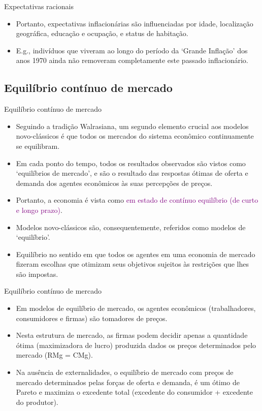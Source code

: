 \documentclass[10pt]{beamer}
\begin{document}
\begin{frame}{Expectativas racionais}
    \begin{itemize}
        \item Portanto, expectativas inflacionárias são influenciadas por idade, localização geográfica, educação e ocupação, e status de habitação.
        \bigskip
        \item E.g., indivíduos que viveram ao longo do período da `Grande Inflação' dos anos 1970 ainda não removeram completamente este passado inflacionário.
    \end{itemize}
\end{frame}

\subsection{Equilíbrio contínuo de mercado}

\begin{frame}{Equilíbrio contínuo de mercado}
    \begin{itemize}
        \item Seguindo a tradição Walrasiana, um segundo elemento crucial aos modelos novo-clássicos é que todos os mercados do sistema econômico continuamente se equilibram.
        \bigskip
        \item Em cada ponto do tempo, todos os resultados observados são vistos como `equilíbrios de mercado', e são o resultado das respostas ótimas de oferta e demanda dos agentes econômicos às suas percepções de preços.
        \bigskip
        \item Portanto, a economia é vista como \textcolor{purple}{em estado de contínuo equilíbrio (de curto e longo prazo)}.
        \bigskip
        \item Modelos novo-clássicos são, consequentemente, referidos como modelos de `equilíbrio'.
        \bigskip
        \item Equilíbrio no sentido em que todos os agentes em uma economia de mercado fizeram escolhas que otimizam seus objetivos sujeitos às restrições que lhes são impostas.
    \end{itemize}
\end{frame}

\begin{frame}{Equilíbrio contínuo de mercado}
    \begin{itemize}
        \item Em modelos de equilíbrio de mercado, os agentes econômicos (trabalhadores, consumidores e firmas) são tomadores de preços.
        \bigskip
        \item Nesta estrutura de mercado, as firmas podem decidir apenas a quantidade ótima (maximizadora de lucro) produzida dados os preços determinados pelo mercado (RMg = CMg).
        \bigskip
        \item Na ausência de externalidades, o equilíbrio de mercado com preços de mercado determinados pelas forças de oferta e demanda, é um ótimo de Pareto e maximiza o excedente total (excedente do consumidor + excedente do produtor).
    \end{itemize}
\end{frame}
\end{document}

